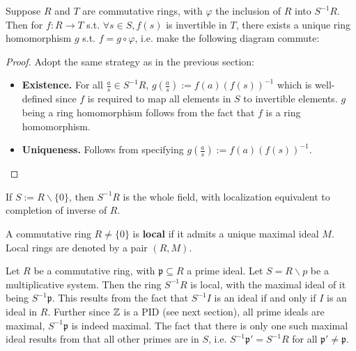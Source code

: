 \begin{theorem}
    Suppose $R$ and $T$ are commutative rings, with $\varphi$ the inclusion of $R$ into $S^{-1}R$. Then for $f: R\to T$ s.t. $\forall s\in S, f(s)$ is invertible in $T$, there exists a unique ring homomorphism $g$ s.t. $f = g\circ \varphi$, i.e. make the following diagram commute:
    \begin{figure}[htbp]
        \centering    
    \end{figure}
\end{theorem}

\begin{proof}
    Adopt the same strategy as in the previous section: 
    \begin{itemize}
        \item \textbf{Existence.} For all $\frac{a}{s}\in S^{-1}R$, $g(\frac{a}{s}) := f(a) (f(s))^{-1}$ which is well-defined since $f$ is required to map all elements in $S$ to invertible elements. $g$ being a ring homomorphism follows from the fact that $f$ is a ring homomorphism. 
        \item \textbf{Uniqueness.} Follows from specifying $g(\frac{a}{s}) := f(a) (f(s))^{-1}$.
    \end{itemize}
\end{proof}

\begin{remark}
    If $S := R\smallsetminus\{0\}$, then $S^{-1}R$ is the whole field, with localization equivalent to completion of inverse of $R$.
\end{remark}

\begin{definition}
    A commutative ring $R\neq \{0\}$ is \textbf{local} if it admits a unique maximal ideal $M$. Local rings are denoted by a pair $(R, M)$.
\end{definition}

\begin{example}
    Let $R$ be a commutative ring, with $\mathfrak{p} \subseteq R$ a prime ideal. Let $S = R\smallsetminus p$ be a multiplicative system. Then the ring $S^{-1}R$ is local, with the maximal ideal of it being $S^{-1}\mathfrak{p}$. This results from the fact that $S^{-1}I$ is an ideal if and only if $I$ is an ideal in $R$. Further since $\mathbb{Z}$ is a PID (see next section), all prime ideals are maximal, $S^{-1}\mathfrak{p}$ is indeed maximal. The fact that there is only one such maximal ideal results from that all other primes are in $S$, i.e. $S^{-1}\mathfrak{p}'=S^{-1}R$ for all $\mathfrak{p}' \neq \mathfrak{p}$. 
\end{example}

